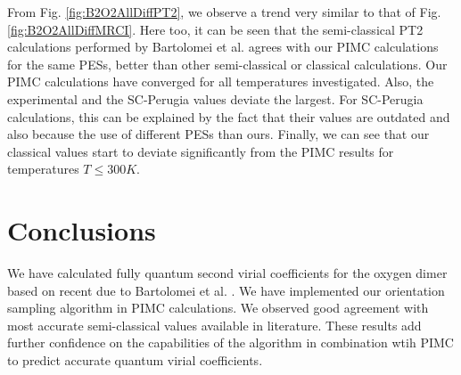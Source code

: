     From Fig. \ref{fig:B2O2AllDiffPT2}, we observe a trend very similar to that of Fig. \ref{fig:B2O2AllDiffMRCI}. Here too, it can be seen that the semi-classical PT2 calculations performed by Bartolomei et al. \cite{Bartolomei2010} agrees with our PIMC calculations for the same PESs, better than other semi-classical or classical calculations. Our PIMC calculations have converged for all temperatures investigated. Also, the experimental and the SC-Perugia values deviate the largest. For SC-Perugia calculations, this can be explained by the fact that their values are outdated and also because the use of different PESs than ours. Finally, we can see that our classical values start to deviate significantly from the PIMC results for temperatures $T \le 300K$.

    \section{Conclusions}
        We have calculated fully quantum second virial coefficients for the oxygen dimer based on recent \abinitio{} \PESs due to Bartolomei et al. \cite{Bartolomei2010}. We have implemented our orientation sampling algorithm in PIMC calculations. We observed good agreement with most accurate semi-classical values available in literature. These results add further confidence on the capabilities of the algorithm in combination wtih PIMC to predict accurate quantum virial coefficients.
